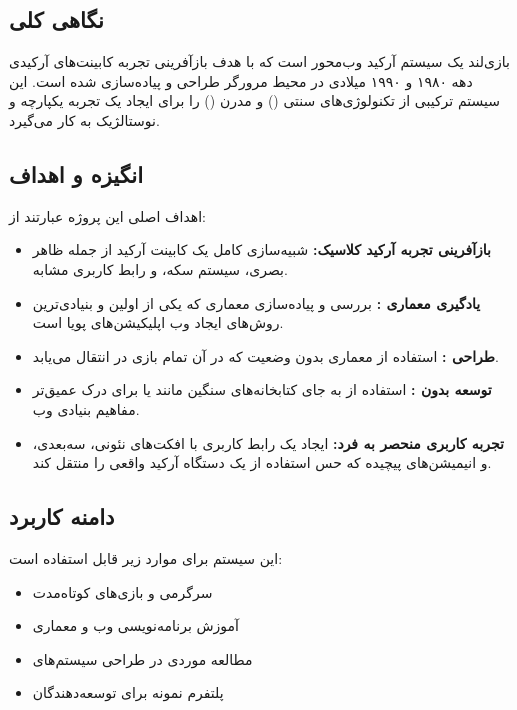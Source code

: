 \documentclass[12pt,a4paper]{article}
\begin{document}
	\subsection{نگاهی کلی}
	بازی‌لند یک سیستم آرکید وب‌محور است که با هدف بازآفرینی تجربه کابینت‌های آرکیدی دهه ۱۹۸۰ و ۱۹۹۰ میلادی در محیط مرورگر طراحی و پیاده‌سازی شده است.
	این سیستم ترکیبی از تکنولوژی‌های سنتی () و مدرن () را برای ایجاد یک تجربه یکپارچه و نوستالژیک به کار می‌گیرد.
	
	\subsection{انگیزه و اهداف}
	اهداف اصلی این پروژه عبارتند از:
	
	\begin{itemize}
		\item \textbf{بازآفرینی تجربه آرکید کلاسیک:} شبیه‌سازی کامل یک کابینت آرکید از جمله ظاهر بصری، سیستم سکه، و رابط کاربری مشابه.
		\item \textbf{یادگیری معماری :} بررسی و پیاده‌سازی معماری  که یکی از اولین و بنیادی‌ترین روش‌های ایجاد وب اپلیکیشن‌های پویا است.
		\item \textbf{طراحی :} استفاده از معماری بدون وضعیت که در آن تمام  بازی در  انتقال می‌یابد.
		\item \textbf{توسعه بدون :} استفاده از  به جای کتابخانه‌های سنگین مانند  یا  برای درک عمیق‌تر مفاهیم بنیادی وب.
		\item \textbf{تجربه کاربری منحصر به فرد:} ایجاد یک رابط کاربری با افکت‌های نئونی، سه‌بعدی، و انیمیشن‌های پیچیده که حس استفاده از یک دستگاه آرکید واقعی را منتقل کند.
	\end{itemize}
	
	\subsection{دامنه کاربرد}
	این سیستم برای موارد زیر قابل استفاده است:
	
	\begin{itemize}
		\item سرگرمی و بازی‌های کوتاه‌مدت
		\item آموزش برنامه‌نویسی وب و معماری 
		\item مطالعه موردی در طراحی سیستم‌های 
		\item پلتفرم نمونه برای توسعه‌دهندگان
	\end{itemize}
	
\end{document}
